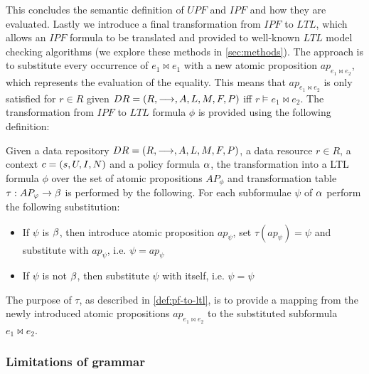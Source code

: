 This concludes the semantic definition of $UPF$ and $IPF$ and how they are evaluated. Lastly we introduce a final transformation from $IPF$ to $LTL$, which allows an $IPF$ formula to be translated and provided to well-known $LTL$ model checking algorithms (we explore these methods in \ref{sec:methods}). The approach is to substitute every occurrence of $e_1 \bowtie e_1$ with a new atomic proposition $ap_{e_1 \bowtie e_2}$, which represents the evaluation of the equality. This means that $ap_{e_1 \bowtie e_2}$ is only satisfied for $r \in R$ given $DR= \left( R, \longrightarrow, A, L, M, F, P \right)$ iff $r \models e_1 \bowtie e_2$. The transformation from $IPF$ to $LTL$ formula $\phi$ is provided using the following definition:
\begin{definition}\label{def:pf-to-ltl}
Given a data repository $DR= \left( R, \longrightarrow, A, L, M, F, P \right)$, a data resource $r \in R$, a context $c = \left( s, U, I, N \right)$ and a policy formula $\alpha$, the transformation into a LTL formula $\phi$ over the set of atomic propositions $AP_\phi$ and transformation table $\tau : AP_\varphi \rightarrow \beta$ is performed by the following. For each subformulae $\psi$ of $\alpha$ perform the following substitution:
\begin{itemize}
    \item If $\psi$ is $\beta$, then introduce atomic proposition $ap_\psi$, set $\tau(ap_\psi) = \psi$ and substitute with $ap_\psi$, i.e. $\psi = ap_\psi$
    \item If $\psi$ is not $\beta$, then substitute $\psi$ with itself, i.e. $\psi = \psi$
\end{itemize}
\end{definition}
The purpose of $\tau$, as described in \autoref{def:pf-to-ltl}, is to provide a mapping from the newly introduced atomic propositions $ap_{e_1 \bowtie e_2}$ to the substituted subformula $e_1 \bowtie e_2$.

\subsubsection{Limitations of grammar}